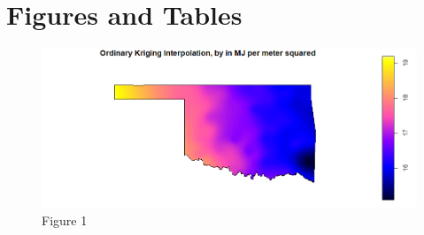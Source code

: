\documentclass[12pt,english]{article}
\begin{document}
\vfill

\pagebreak{}

\begin{spacing}{1.0}






\end{spacing}



\vfill

\pagebreak{}

\clearpage






\section*{Figures and Tables}\label{sec:figTables}







\begin{figure}[ht!]

\centering

\bigskip{}

\includegraphics[width=.9\linewidth]{Rkrigf1.png}

\caption{Figure 1}

\label{fig:fig1}

\end{figure}
\end{document}
